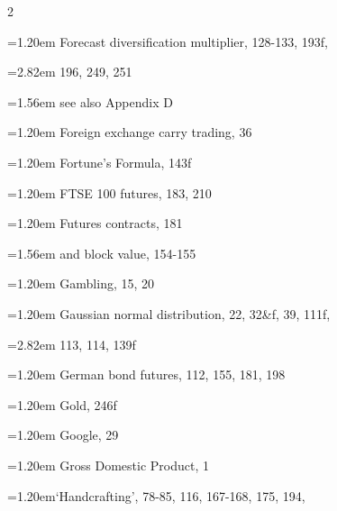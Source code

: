 {\begin{multicols}{2}
\par \noindent\hangindent=1.20em\hspace*{0.00em} Forecast diversification multiplier, 128-133, 193f,
\par \noindent\hangindent=2.82em\hspace*{1.62em} 196, 249, 251
\par \noindent\hangindent=1.56em\hspace*{0.36em} see also Appendix D
\par \noindent\hangindent=1.20em\hspace*{0.00em} Foreign exchange carry trading, 36
\par \noindent\hangindent=1.20em\hspace*{0.00em} Fortune’s Formula, 143f
\par \noindent\hangindent=1.20em\hspace*{0.00em} FTSE 100 futures, 183, 210
\par \noindent\hangindent=1.20em\hspace*{0.00em} Futures contracts, 181
\par \noindent\hangindent=1.56em\hspace*{0.36em} and block value, 154-155
\par \noindent\hangindent=1.20em\hspace*{0.00em} Gambling, 15, 20
\par \noindent\hangindent=1.20em\hspace*{0.00em} Gaussian normal distribution, 22, 32\&f, 39, 111f,
\par \noindent\hangindent=2.82em\hspace*{1.62em} 113, 114, 139f
\par \noindent\hangindent=1.20em\hspace*{0.00em} German bond futures, 112, 155, 181, 198
\par \noindent\hangindent=1.20em\hspace*{0.00em} Gold, 246f
\par \noindent\hangindent=1.20em\hspace*{0.00em} Google, 29
\par \noindent\hangindent=1.20em\hspace*{0.00em} Gross Domestic Product, 1
\par \noindent\hangindent=1.20em\hspace*{0.00em}‘Handcrafting’, 78-85, 116, 167-168, 175, 194,

\end{multicols}}

